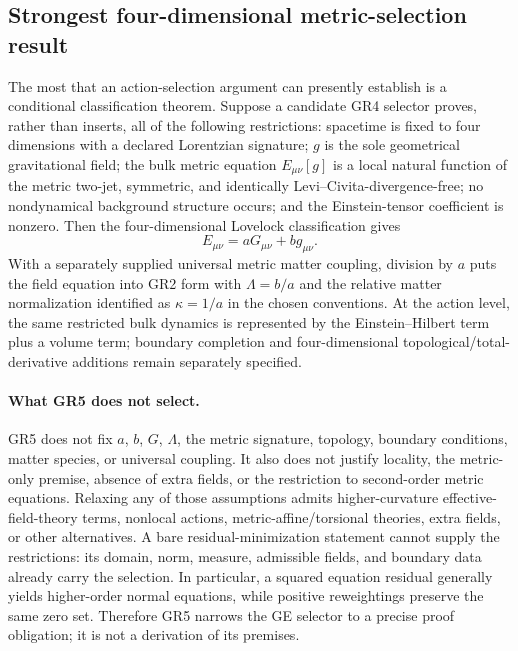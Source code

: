 \documentclass[11pt,a4paper]{article}
\theoremstyle{remark}
\begin{document}
\subsection{Strongest four-dimensional metric-selection result}
The most that an action-selection argument can presently establish is a
conditional classification theorem. Suppose a candidate GR4 selector proves,
rather than inserts, all of the following restrictions: spacetime is fixed to
four dimensions with a declared Lorentzian signature; $g$ is the sole
geometrical gravitational field; the bulk metric equation $E_{\mu\nu}[g]$ is a
local natural function of the metric two-jet, symmetric, and identically
Levi--Civita-divergence-free; no nondynamical background structure occurs; and
the Einstein-tensor coefficient is nonzero. Then the four-dimensional Lovelock
classification gives
\[
 \boxed{E_{\mu\nu}=aG_{\mu\nu}+b g_{\mu\nu}.}\tag{GR5}
\]
With a separately supplied universal metric matter coupling, division by $a$
puts the field equation into GR2 form with $\Lambda=b/a$ and the relative
matter normalization identified as $\kappa=1/a$ in the chosen conventions.
At the action level, the same restricted bulk dynamics is represented by the
Einstein--Hilbert term plus a volume term; boundary completion and
four-dimensional topological/total-derivative additions remain separately
specified.

\paragraph{What GR5 does not select.}
GR5 does not fix $a$, $b$, $G$, $\Lambda$, the metric signature, topology,
boundary conditions, matter species, or universal coupling. It also does not
justify locality, the metric-only premise, absence of extra fields, or the
restriction to second-order metric equations. Relaxing any of those assumptions
admits higher-curvature effective-field-theory terms, nonlocal actions,
metric-affine/torsional theories, extra fields, or other alternatives. A bare
residual-minimization statement cannot supply the restrictions: its domain,
norm, measure, admissible fields, and boundary data already carry the
selection. In particular, a squared equation residual generally yields
higher-order normal equations, while positive reweightings preserve the same
zero set. Therefore GR5 narrows the GE selector to a precise proof obligation;
it is not a derivation of its premises.
\end{document}
